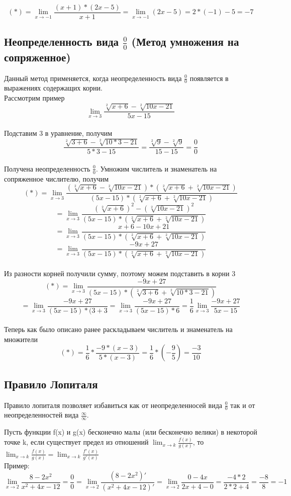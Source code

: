 \documentclass[12pt,a4paper]{article}
\begin{document}
$$ (*) = \lim_{x \to -1}\frac{(x+1)*(2x-5)}{x+1} = \lim_{x \to -1}(2x-5) = 2 * (-1) - 5 = -7 $$

\subsection{Неопределенность вида $\frac{0}{0}$ (Метод умножения на сопряженное)}
Данный метод применяется, когда неопределенность вида $\frac{0}{0}$ появляется в выражениях содержащих корни.
\\
Рассмотрим пример
$$ \lim_{x \to 3}\frac{\sqrt[2]{x+6}-\sqrt[2]{10x-21}}{5x-15} $$
\\
Подставим 3 в уравнение, получим
$$ \frac{\sqrt[2]{3+6}-\sqrt[2]{10*3-21}}{5*3-15} = \frac{\sqrt[2]{9}-\sqrt[2]{9}}{15-15} = \frac{0}{0} $$
\\
Получена неопределенность $\frac{0}{0}$.
Умножим числитель и знаменатель на сопряженное числителю, получим
$$ (*) = \lim_{x \to 3}\frac{(\sqrt[2]{x+6}-\sqrt[2]{10x-21}) * (\sqrt[2]{x+6}+\sqrt[2]{10x-21})}{(5x-15) * (\sqrt[2]{x+6}+\sqrt[2]{10x-21})} $$
$$ = \lim_{x \to 3}\frac{(\sqrt[2]{x+6})^2 - (\sqrt[2]{10x-21})^2}{(5x-15) * (\sqrt[2]{x+6}+\sqrt[2]{10x-21})} $$
$$ = \lim_{x \to 3}\frac{x+6-10x+21}{(5x-15) * (\sqrt[2]{x+6}+\sqrt[2]{10x-21})} $$
$$ = \lim_{x \to 3}\frac{-9x+27}{(5x-15) * (\sqrt[2]{x+6}+\sqrt[2]{10x-21})} $$
\\
Из разности корней получили сумму, поэтому можем подставить в корни 3
$$ (*) = \lim_{x \to 3}\frac{-9x+27}{(5x-15) * (\sqrt[2]{3+6}+\sqrt[2]{10 * 3 -21})} $$
$$ = \lim_{x \to 3}\frac{-9x+27}{(5x-15) * (3+3} = \lim_{x \to 3}\frac{-9x+27}{(5x-15) * 6}
= \frac{1}{6} \lim_{x \to 3}\frac{-9x+27}{5x-15} $$
\\
Теперь как было описано ранее раскладываем числитель и знаменатель на множители
$$ (*) = \frac{1}{6} * \frac{-9 * (x-3)}{5*(x-3)} = \frac{1}{6} * (-\frac{9}{5}) = \frac{-3}{10}$$
\subsection{Правило Лопиталя}
Правило лопиталя позволяет избавиться как от неопределенносей вида $\frac{0}{0}$ так и от неопределенностей вида $\frac{\infty}{\infty}$.

Пусть функции f(x) и g(x) бесконечно малы (или бесконечно велики) в некоторой точке k, если существует предел из отношений $\lim_{x \to k}\frac{f(x)}{g(x)}$, то $\lim_{x \to k}\frac{f(x)}{g(x)} = \lim_{x \to k}\frac{f'(x)}{g'(x)}$
\\
Пример:
$$ \lim_{x \to 2}\frac{8-2x^2}{x^2+4x-12}=\frac{0}{0}=\lim_{x \to 2}\frac{(8-2x^2)'}{(x^2+4x-12)'}=\lim_{x \to 2}\frac{0-4x}{2x+4-0} = \frac{-4 * 2}{2 * 2 + 4} = \frac{-8}{8} = -1$$
\end{document}
